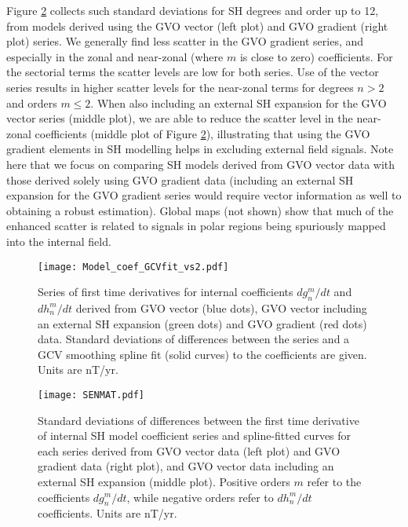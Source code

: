 \documentclass[extra,mreferee]{gji}
\begin{document}
Figure \ref{Fig:15} collects such standard deviations for SH degrees and order up to 12, from models derived using the GVO vector (left plot) and GVO gradient (right plot) series. We generally find less scatter in the GVO gradient series, and especially in the zonal and near-zonal (where $m$ is close to zero) coefficients. For the sectorial terms the scatter levels are low for both series. Use of the vector series results in higher scatter levels for the near-zonal terms for degrees $n>2$ and orders $m \leq 2$. When also including an external SH expansion for the GVO vector series (middle plot), we are able to reduce the scatter level in the near-zonal coefficients (middle plot of Figure \ref{Fig:15}), illustrating that using the GVO gradient elements in SH modelling helps in excluding external field signals. Note here that we focus on comparing SH models derived from GVO vector data with those derived solely using GVO gradient data (including an external SH expansion for the GVO gradient series would require vector information as well to obtaining a robust estimation). Global maps (not shown) show that much of the enhanced scatter is related to signals in polar regions being spuriously mapped into the internal field.

\begin{figure}
\centerline{\texttt{[image: Model\_coef\_GCVfit\_vs2.pdf]}}
\caption{Series of first time derivatives for  internal coefficients $dg_n^m/dt$ and $dh_n^m/dt$ derived from GVO vector (blue dots), GVO vector including an external SH expansion (green dots) and GVO gradient (red dots) data. Standard deviations of differences between the series and a GCV smoothing spline fit (solid curves) to the coefficients are given. Units are nT/yr.}
\label{Fig:14}	
\end{figure} 

\begin{figure}
\centerline{\texttt{[image: SENMAT.pdf]}}
\caption{Standard deviations of differences between the first time derivative of internal SH model coefficient series and spline-fitted curves for each series derived from GVO vector data (left plot) and GVO gradient data (right plot), and GVO vector data including an external SH expansion (middle plot). Positive orders $m$ refer to the coefficients $dg_n^m/dt$, while negative orders refer to $dh_n^m/dt$ coefficients. Units are nT/yr.}	
\label{Fig:15}
\end{figure}
\end{document}
